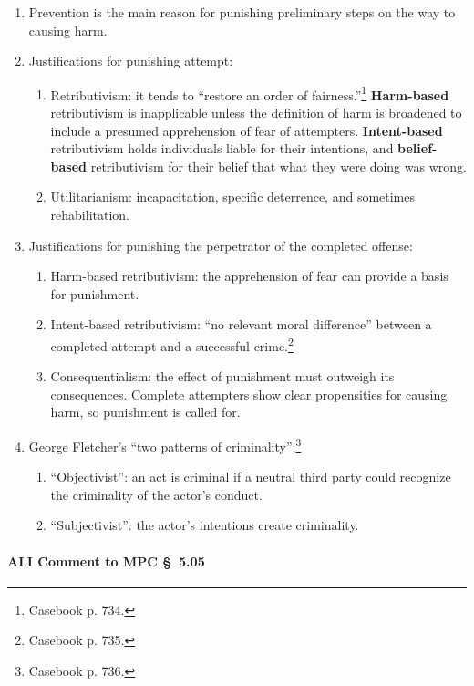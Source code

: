 \begin{enumerate}
    \item Prevention is the main reason for punishing preliminary steps on the 
    way to causing harm.
    \item Justifications for punishing attempt:
    \begin{enumerate}
        \item Retributivism: it tends to ``restore an order of 
        fairness.''\footnote{Casebook p. 734.} \textbf{Harm-based} 
        retributivism is inapplicable unless the definition of harm is 
        broadened to include a presumed apprehension of fear of attempters.  
        \textbf{Intent-based} retributivism holds individuals liable for their 
        intentions, and \textbf{belief-based} retributivism for their belief 
        that what they were doing was wrong.
        \item Utilitarianism: incapacitation, specific deterrence, and 
        sometimes rehabilitation.
    \end{enumerate}
    \item Justifications for punishing the perpetrator of the completed 
    offense:
    \begin{enumerate}
        \item Harm-based retributivism: the apprehension of fear can provide a 
        basis for punishment.
        \item Intent-based retributivism: ``no relevant moral difference'' 
        between a completed attempt and a successful crime.\footnote{Casebook 
        p.  735.}
        \item Consequentialism: the effect of punishment must outweigh its 
        consequences. Complete attempters show clear propensities for causing 
        harm, so punishment is called for.
    \end{enumerate}
    \item George Fletcher's ``two patterns of criminality'':\footnote{Casebook 
    p. 736.}
    \begin{enumerate}
        \item ``Objectivist'': an act is criminal if a neutral third party 
        could recognize the criminality of the actor's conduct.
        \item ``Subjectivist'': the actor's intentions create criminality.
    \end{enumerate}
\end{enumerate}

\paragraph{ALI Comment to MPC \S\ 5.05}

